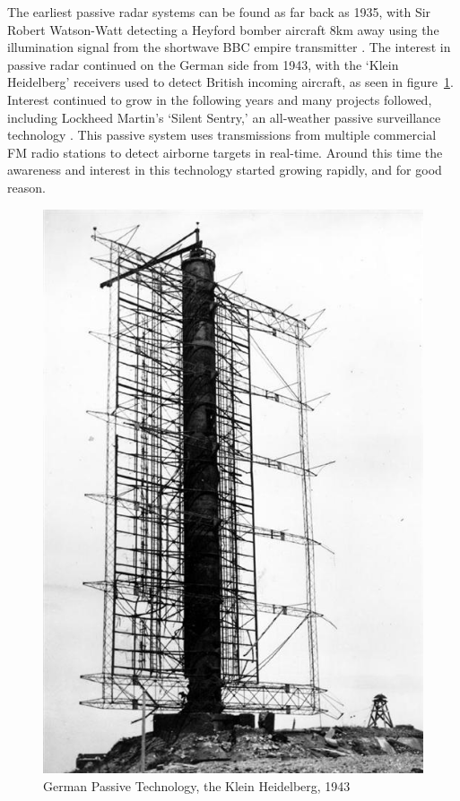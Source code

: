 \documentclass[12pt,openany,a4paper]{book}
\begin{document}
The earliest passive radar systems can be found as far back as 1935, with Sir Robert Watson-Watt detecting a Heyford bomber aircraft 8km away using the illumination signal from the shortwave BBC empire transmitter \cite{HK5, HK6}. The interest in passive radar continued on the German side from 1943, with the ‘Klein Heidelberg’ receivers used to detect British incoming aircraft, as seen in figure~\ref{KH}. Interest continued to grow in the following years and many projects followed, including Lockheed Martin’s ‘Silent Sentry,’ an all-weather passive surveillance technology \cite{LHM}. This passive system uses transmissions from multiple commercial FM radio stations to detect airborne targets in real-time. Around this time the awareness and interest in this technology started growing rapidly, and for good reason.

\bigskip

\begin{figure}[htbp]
\centerline{\includegraphics{KHTF.jpg}}
\caption{German Passive Technology, the Klein Heidelberg, 1943 \cite{pic1}}
\label{KH}
\end{figure}
\end{document}
